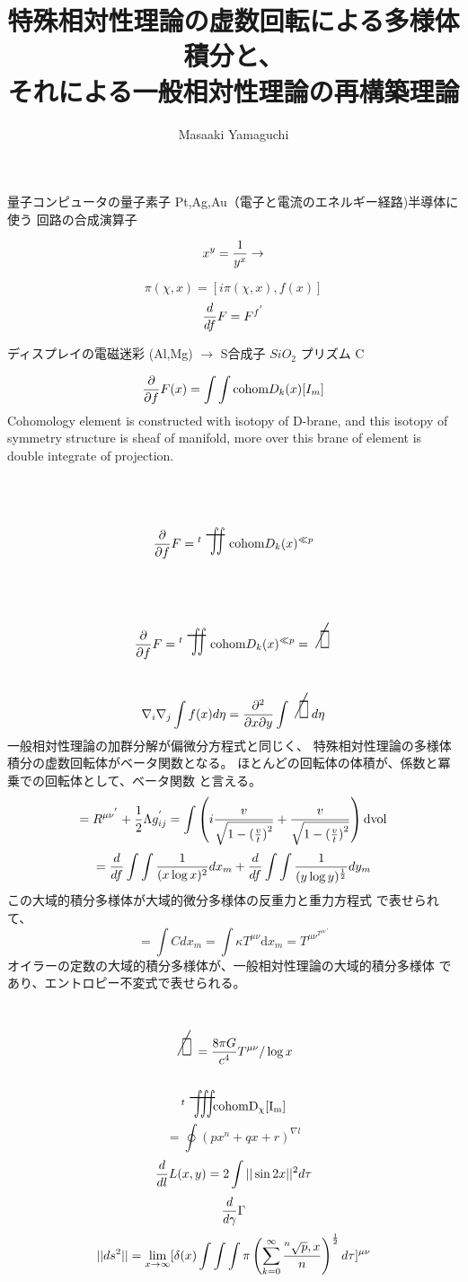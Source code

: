 \documentclass{jsarticle}
\begin{document}
  量子コンピュータの量子素子 Pt,Ag,Au（電子と電流のエネルギー経路)半導体に
  使う
  回路の合成演算子 


  $$ x^y = {1 \over {y^x}} \to $$

  $$ \pi(\chi,x) = [i\pi(\chi,x),f(x)] $$
  $$ {d \over df}F = F^{{f}^{'}} $$


  ディスプレイの電磁迷彩 (Al,Mg) $\to$ S合成子 $Si O_2 $
  プリズム C
\title{特殊相対性理論の虚数回転による多様体積分と、\\
それによる一般相対性理論の再構築理論}
\author{Masaaki Yamaguchi}
   
  \newcommand{\oiint}{%
	   \begin{picture}(15,15)
		   \put(0,0){
			   $ \scalebox{1}[2]{$\iint$} $}
		   \put(2,2){$\bigcirc$}
	   \end{picture} %
	   }


 $$ {\partial \over \partial f}F(x) = \int \int \text{cohom}D_k(x)[I_m]  $$
 Cohomology element is constructed with isotopy of D-brane,
 and this isotopy of symmetry structure is sheaf of manifold,
 more over this brane of element is double integrate of projection.
 $$ {\partial \over \partial f}F = {{}^t \scalebox{1}[2]{\variint}}
 \text{cohom}D_k(x)^{\ll p} $$

  $$  {\partial \over \partial f}F = {{}^t \scalebox{1}[2]{\variint}}
 \text{cohom}D_k(x)^{\ll p} = 
\scalebox{1}[2]{\alearletter}$$ 
   $$ \nabla_{i} \nabla_{j} \int f(x) d \eta = {\partial^2 \over {\partial x
   \partial y}}\int \scalebox{1}[2]{\alearletter} d \eta $$
   一般相対性理論の加群分解が偏微分方程式と同じく、
   特殊相対性理論の多様体積分の虚数回転体がベータ関数となる。
   ほとんどの回転体の体積が、係数と冪乗での回転体として、ベータ関数
   と言える。
   $$ = R^{{\mu\nu}^{'}} + {1 \over 2}\Lambda g_{ij}^{'} = \int 
   \left(i {{v \over {
	   \sqrt{1 - 
   {{{({v \over t})}}^{2}}}}}} + {v \over {\sqrt{1 - 
   {{{({v \over t})}}^{2}}}}}\right)\mathrm{dvol} $$
   $$ = {d \over df}\int \int{1 \over {(x \log x)^2}}dx_m +
   {d \over df}\int \int {1 \over {(y \log y)^{1 \over 2}}}dy_m $$ 
    この大域的積分多様体が大域的微分多様体の反重力と重力方程式
    で表せられて、
   $$ = \int C dx_m = \int \kappa T^{\mu\nu} \mathrm dx_m = T^{{\mu\nu}{^{T^
   {\mu\nu}}}^{'}}$$
   オイラーの定数の大域的積分多様体が、一般相対性理論の大域的積分多様体
   であり、エントロピー不変式で表せられる。

  $$ \scalebox{1}[2]{\alearletter} = 
  {{{{8 \pi G} \over {c^4}}T^{\mu\nu}}/ \log x} $$
  $$ {}^{t}\scalebox{1}[2]{\variiint}\mathrm{cohom D_{\chi}[I_m]}$$
  $$ = \oint {(px^n + qx + r)^{\nabla l}} $$
  $$ {d \over d l}L(x,y) = 2 \int ||\sin 2x||^{2}d \tau $$
  $$ {d \over d \gamma}\Gamma $$
 $$ ||ds^2|| = \lim_{x \to \infty} [\delta(x) \int \int \int \pi \left( \sum_{k=0}^{\infty}
		{{}^n\sqrt{p},x \over n} \right)
^{1 \over 2}d \tau]^{\mu\nu} $$
\end{document}
